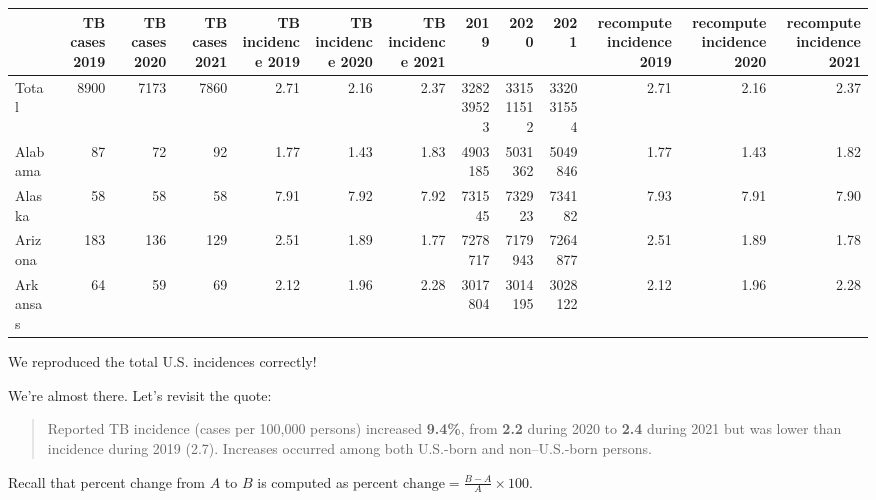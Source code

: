 \documentclass[
  letterpaper,
  DIV=11,
  numbers=noendperiod]{scrreprt}
\begin{document}
\begin{tabular}{lrrrrrrrrrrrr}
\toprule
{} &  TB cases 2019 &  TB cases 2020 &  TB cases 2021 &  TB incidence 2019 &  TB incidence 2020 &  TB incidence 2021 &       2019 &       2020 &       2021 &  recompute incidence 2019 &  recompute incidence 2020 &  recompute incidence 2021 \\
\midrule
Total    &           8900 &           7173 &           7860 &               2.71 &               2.16 &               2.37 &  328239523 &  331511512 &  332031554 &                      2.71 &                      2.16 &                      2.37 \\
Alabama  &             87 &             72 &             92 &               1.77 &               1.43 &               1.83 &    4903185 &    5031362 &    5049846 &                      1.77 &                      1.43 &                      1.82 \\
Alaska   &             58 &             58 &             58 &               7.91 &               7.92 &               7.92 &     731545 &     732923 &     734182 &                      7.93 &                      7.91 &                      7.90 \\
Arizona  &            183 &            136 &            129 &               2.51 &               1.89 &               1.77 &    7278717 &    7179943 &    7264877 &                      2.51 &                      1.89 &                      1.78 \\
Arkansas &             64 &             59 &             69 &               2.12 &               1.96 &               2.28 &    3017804 &    3014195 &    3028122 &                      2.12 &                      1.96 &                      2.28 \\
\bottomrule
\end{tabular}

We reproduced the total U.S. incidences correctly!

We're almost there. Let's revisit the quote:

\begin{quote}
Reported TB incidence (cases per 100,000 persons) increased
\textbf{9.4\%}, from \textbf{2.2} during 2020 to \textbf{2.4} during
2021 but was lower than incidence during 2019 (2.7). Increases occurred
among both U.S.-born and non--U.S.-born persons.
\end{quote}

Recall that percent change from \(A\) to \(B\) is computed as
\(\text{percent change} = \frac{B - A}{A} \times 100\).
\end{document}
